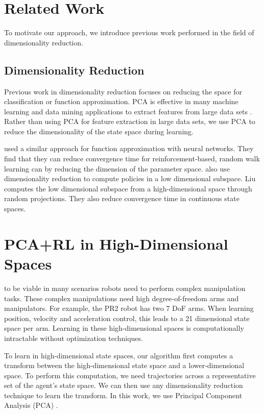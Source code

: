 \documentclass[twoside,11pt]{article}
\begin{document}
\section{Related Work}
To motivate our approach, we introduce previous work performed in the field of dimensionality reduction.

\subsection{Dimensionality Reduction}
Previous work in dimensionality reduction focuses on reducing the space for classification or function approximation. PCA is effective in many machine learning and data mining applications to extract features from large data sets \citep{Pechenizkiy:features, 139758}. Rather than using PCA for feature extraction in large data sets, we use PCA to reduce the dimensionality of the state space during learning.

\citet{Swinehart05dimensionalreduction} used a similar approach for function approximation with neural networks. They find that they can reduce convergence time for reinforcement-based, random walk learning can by reducing the dimension of the parameter space. \citet{Liu11compressivereinforcement} also use dimensionality reduction to compute policies in a low dimensional subspace. Liu computes the low dimensional subspace from a high-dimensional space through random projections. They also reduce convergence time in continuous state spaces.

\section{PCA+RL in High-Dimensional Spaces}
\label{High-Dimensional}

to be viable in many scenarios robots need to perform complex manipulation tasks. These complex manipulations need high degree-of-freedom arms and manipulators. For example, the PR2 robot has two 7 DoF arms. When learning position, velocity and acceleration control, this leads to a 21 dimensional state space per arm. Learning in these high-dimensional spaces is computationally intractable without optimization techniques.

To learn in high-dimensional state spaces, our algorithm first computes a transform between the high-dimensional state space and a lower-dimensional space. To perform this computation, we need trajectories across a representative set of the agent's state space. We can then use any dimensionality reduction technique to learn the transform. In this work, we use Principal Component Analysis (PCA) \citep{Shlens05atutorial}. 
\end{document}
